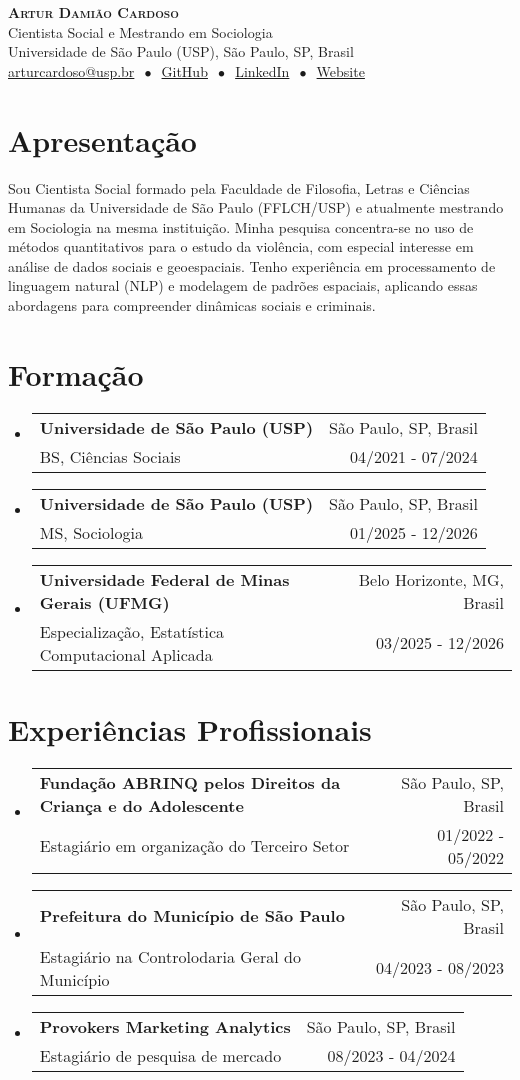 \documentclass[letterpaper,11pt]{article}
\makeatletter
\newcommand{\cvheading}[4]{
  \vspace{-2pt}\item
    \begin{tabular*}{\textwidth}[t]{l@{\extracolsep{\fill}}r}
      \textbf{#1} & #2\\
      \small#3 & \small #4\\
    \end{tabular*}\vspace{-7pt}
}
\newcommand{\cvheadingstart}{\begin{itemize}[leftmargin=0in, label={}]}
\newcommand{\cvheadingend}{\end{itemize}}
\makeatother
\begin{document}
\begin{center}
  \textbf{\LARGE\scshape Artur Damião Cardoso}\\
  \vspace{5pt}\small
  Cientista Social e Mestrando em Sociologia\\
  Universidade de São Paulo (USP), São Paulo, SP, Brasil\\
  \href{mailto:}{arturcardoso@usp.br}
  $\ \bullet\ $ 
  \href{https://github.com/arturdamiao}{GitHub}
  $\ \bullet\ $
  \href{https://www.linkedin.com/in/artur-damião-983b88168/}{LinkedIn}
    $\ \bullet\ $
  \href{https://arturdamiao.com/}{Website}
\end{center}

\section{Apresentação}
Sou Cientista Social formado pela Faculdade de Filosofia, Letras e Ciências Humanas da Universidade de São Paulo (FFLCH/USP)
e atualmente mestrando em Sociologia na mesma instituição.
Minha pesquisa concentra-se no uso de métodos quantitativos para o estudo da violência, com especial interesse em análise de dados sociais e geoespaciais. Tenho experiência em processamento de linguagem natural (NLP) e modelagem de padrões espaciais, aplicando essas abordagens para compreender dinâmicas sociais e criminais.

\section{Formação}
\cvheadingstart
  \cvheading
    {Universidade de São Paulo (USP)}{São Paulo, SP, Brasil}
    {BS, Ciências Sociais} {04/2021 - 07/2024}
  \cvheading
    {Universidade de São Paulo (USP)}{São Paulo, SP, Brasil}
    {MS, Sociologia}{01/2025 - 12/2026}
  \cvheading
    {Universidade Federal de Minas Gerais (UFMG)}{Belo Horizonte, MG, Brasil}
    {Especialização, Estatística Computacional Aplicada}{03/2025 - 12/2026}
\cvheadingend

\section{Experiências Profissionais}
\cvheadingstart
  \cvheading
    {Fundação ABRINQ pelos Direitos da Criança e do Adolescente}{São Paulo, SP, Brasil}
    {Estagiário em organização do Terceiro Setor}{01/2022 - 05/2022}
  \cvheading
    {Prefeitura do Município de São Paulo}{São Paulo, SP, Brasil}
    {Estagiário na Controlodaria Geral do Município}{04/2023 - 08/2023}
  \cvheading
    {Provokers Marketing Analytics}{São Paulo, SP, Brasil}
    {Estagiário de pesquisa de mercado}{08/2023 - 04/2024}
\cvheadingend
\end{document}
